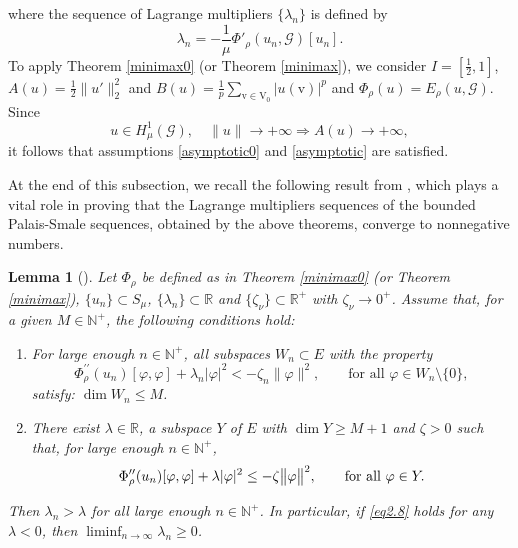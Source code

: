 \documentclass[11pt]{amsart}
\newtheorem{lemma}[theorem]{Lemma}
\newcommand{\abs}[1]{\lvert#1\rvert}
\newcommand{\norm}[1]{\lVert#1\rVert}
\newcommand{\G}{\mathcal{G}}
\newcommand{\V}{\mathrm{V}}
\newcommand{\vv}{\mathrm{v}}
\numberwithin{equation}{section}
\begin{document}
where the sequence of Lagrange multipliers $\{\lambda_n\}$ is defined by
\begin{equation}
\lambda_n = -\frac{1}{\mu} \Phi'_\rho(u_n, \mathcal{G})[u_n].
\end{equation}
To apply Theorem \ref{minimax0} (or Theorem \ref{minimax}), we consider $I=[\frac{1}{2},1]$, $A(u)=\frac{1}{2}\norm{u'}^{2}_2$ and $B(u)=\frac{1}{p}\sum_{\vv \in \V_{0}}\abs{u(\vv)}^p$ and $\Phi_\rho(u)=E_\rho(u,\G)$. Since
$$
u \in H^1_\mu(\G), \quad \norm{u}\to +\infty \Rightarrow A(u) \to +\infty,
$$
it follows that assumptions \eqref{asymptotic0} and \eqref{asymptotic} are satisfied.





\iffalse
At the end of this subsection, we recall the following result from \cite{Ca}, which plays a vital role in proving that the Lagrange multipliers sequences of the bounded Palais-Smale sequences, obtained by the above theorems, converge to nonnegative numbers. 
\begin{lemma}[{\cite[Lemma 2.7]{Ca}}]\label{lem 2.7}
Let $\Phi_\rho$ be defined as in Theorem \ref{minimax0} (or Theorem \ref{minimax}), \(\{u_{n}\}\subset S_{\mu}\), \(\{\lambda_{n}\}\subset\mathbb{R}\) and \(\{\zeta_{\nu}\}\subset\mathbb{R}^{+}\) with \(\zeta_{\nu}\to 0^{+}\). Assume that, for a given \(M\in\mathbb{N}^+\), the following conditions hold:
\begin{enumerate}[label=\rm(\roman*)]
\item For large enough \(n\in\mathbb{N}^+\), all subspaces \(W_{n}\subset E\) with the property
\[
\Phi_\rho^{\prime\prime}(u_{n})[\varphi,\varphi]+\lambda_{n}|\varphi|^{2 }<-\zeta_{n}\|\varphi\|^{2},\qquad\text{for all }\varphi\in W_{n}\setminus\{0\},
\]
satisfy: \(\dim W_{n}\leq M\).
\item There exist \(\lambda\in\mathbb{R}\), a subspace \(Y\) of \(E\) with \(\dim Y\geq M+1\) and \(\zeta>0\) such that, for large enough \(n\in\mathbb{N}^+\),
\begin{equation}\label{eq2.8}
\Phi_\rho^{\prime\prime}(u_{n})[\varphi,\varphi]+\lambda|\varphi|^{2} \leq-\zeta\bigl{\|}\varphi\bigr{\|}^{2},\qquad\text{for all }\varphi\in Y.
\end{equation}
\end{enumerate}
Then \(\lambda_{n}>\lambda\) for all large enough \(n\in\mathbb{N}^+\). In particular, if \eqref{eq2.8} holds for any \(\lambda<0\), then \(\liminf_{n\to\infty}\lambda_{n}\geq 0\).
\end{lemma}
\end{document}
